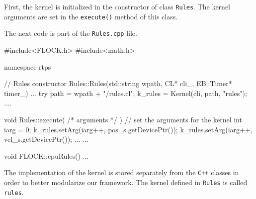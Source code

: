 First, the kernel is initialized in the constructor of class \texttt{Rules}. The kernel 
arguments are set in the \texttt{execute()} method of this class. 

The next code is part of the \texttt{Rules.cpp} file.

\begin{cppcode}{0}
#include<FLOCK.h>
#include<math.h>

namespace rtps
{
	// Rules constructor
	Rules::Rules(std::string wpath, CL* cli_, EB::Timer* timer_)
	{
		...
		try
		{
			path = wpath + "/rules.cl";
			k_rules = Kernel(cli, path, "rules");
		}
		....
	}

	void Rules::execute( /* arguments */ )
	{
		// set the arguments for the kernel
		int iarg = 0;
		k_rules.setArg(iarg++, pos_s.getDevicePtr());
		k_rules.setArg(iarg++, vel_s.getDevicePtr());
		...
	}
	...
	
	void FLOCK::cpuRules()
	{
		...
	}
}
\end{cppcode}

The implementation of the kernel is stored separately from the \texttt{C++} classes in order to better modularize our framework. The kernel defined in \texttt{Rules} is called \texttt{rules}. 





